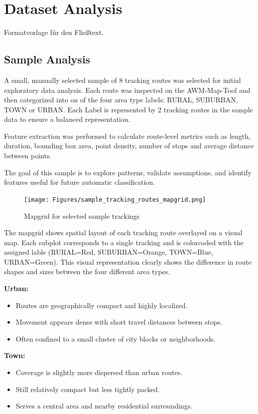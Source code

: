 \documentclass[a4paper,12pt,twoside]{scrreprt}
\begin{document}
\section{Dataset Analysis}
Formatvorlage für den Fließtext.

\subsection{Sample Analysis}

A small, manually selected sample of 8 tracking routes was selected for initial
exploratory data analysis. Each route was inspected on the AWM-Map-Tool and
then categorized into on of the four area type labels: RURAL, SUBURBAN, TOWN or
URBAN. Each Label is represented by 2 tracking routes in the sample data to
ensure a balanced representation.

Feature extraction was performed to calculate route-level metrics such as
length, duration, bounding box area, point density, number of stops and average
distance between points.

The goal of this sample is to explore patterns, validate assumptions, and
identify features useful for future automatic classification.

\begin{figure}[htbp]
  \centering

  \texttt{[image: Figures/sample\_tracking\_routes\_mapgrid.png]}
  \caption{Mapgrid for selected sample trackings}
  \label{fig:sample_mapgrid}
\end{figure}
\FloatBarrier
The mapgrid shows spatial layout of each tracking route overlayed on a visual
map. Each subplot corresponds to a single tracking and is colorcoded with the
assigned lable (RURAL=Red, SUBURBAN=Orange, TOWN=Blue, URBAN=Green). This
visual representation clearly shows the difference in route shapes and sizes
between the four different area types.

\textbf{Urban:}
\begin{itemize}
  \item Routes are geographically compact and highly localized.
  \item Movement appears dense with short travel distances between stops.
  \item Often confined to a small cluster of city blocks or neighborhoods.
\end{itemize}

\textbf{Town:}
\begin{itemize}
  \item Coverage is slightly more dispersed than urban routes.
  \item Still relatively compact but less tightly packed.
  \item Serves a central area and nearby residential surroundings.
\end{itemize}
\end{document}
